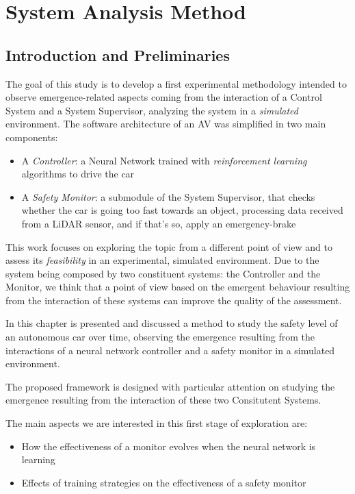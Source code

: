 \chapter{System Analysis Method}

\section{Introduction and Preliminaries}

The goal of this study is to develop a first experimental methodology intended to observe emergence-related aspects coming from the interaction of a Control System and a System Supervisor, analyzing the system in a \textsl{simulated} environment.\newline
The software architecture of an AV was simplified in two main components:

\begin{itemize}
	\item A \textsl{Controller}: a Neural Network trained with \textsl{reinforcement learning} algorithms to drive the car
	\item A \textsl{Safety Monitor}: a submodule of the System Supervisor, that checks whether the car is going too fast towards an object, processing data received from a LiDAR sensor, and if that's so, apply an emergency-brake
\end{itemize}

This work focuses on exploring the topic from a different point of view and to assess its \textsl{feasibility} in an experimental, simulated environment. Due to the system being composed by two constituent systems: the Controller and the Monitor, we think that a point of view based on the emergent behaviour resulting from the interaction of these systems can improve the quality of the assessment.

In this chapter is presented and discussed a method to study the safety level of an autonomous car over time, observing the emergence resulting from the interactions of a neural network controller and a safety monitor in a simulated environment.

The proposed framework is designed with particular attention on studying the emergence resulting from the interaction of these two Consitutent Systems.

The main aspects we are interested in this first stage of exploration are:

\begin{itemize}
	\item How the effectiveness of a monitor evolves when the neural network is learning
	\item Effects of training strategies on the effectiveness of a safety monitor
\end{itemize}

